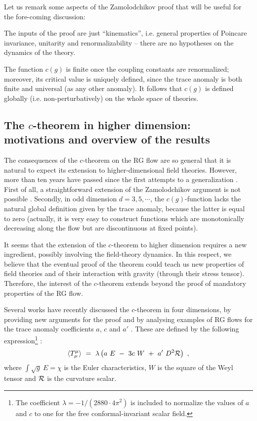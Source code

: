 \documentclass[proceedings]{JHEP}
\newcommand{\beq}{\begin{equation}}
\newcommand{\eeq}{\end{equation}}
\def\l{\lambda}
\def\bra{\langle}
\def\ket{\rangle}
\begin{document}
Let us remark some aspects of the Zamolodchikov proof that will
be useful for the fore-coming discussion:

The inputs of the proof are just ``kinematics'',
i.e. general properties of Poincare invariance,
unitarity and renormalizability -- there are no hypotheses on the
dynamics of the theory.

The function $c(g)$ is finite once the coupling
constants are renormalized; moreover, its critical
value is uniquely defined, since the trace anomaly is
both finite and universal (as any other anomaly).
It follows that $c(g)$ is defined globally 
(i.e. non-perturbatively) on the whole space of theories.





\subsection{The $c$-theorem in higher dimension: motivations
and overview of the results}

The consequences of the $c$-theorem on the RG flow
are so general that it is natural to expect its
extension to higher-dimensional field theories.
However, more than ten years have passed since the
first attempts to a generalization \cite{cardy}\cite{jo}\cite{cfl}.
First of all, a straightforward extension of the 
Zamolodchikov argument is not possible \cite{cfl}. 
Secondly, in odd dimension $d=3,5,\cdots$, the
$c(g)$-function lacks the natural global definition given by 
the trace anomaly, because the latter is equal to zero
(actually, it is very easy to construct functions
which are monotonically decreasing along the flow
but are discontinuous at fixed points).

It seems that the extension of the $c$-theorem
to higher dimension requires a new ingredient, 
possibly involving the field-theory dynamics.
In this respect, we believe that the eventual proof 
of the theorem could teach us new properties of 
field theories and of their interaction with gravity
(through their stress tensor).
Therefore, the interest of the $c$-theorem extends
beyond the proof of mandatory properties of the RG flow.

Several works have recently discussed
the $c$-theorem in four dimensions,
by providing new arguments for the proof \cite{fl}\cite{ath}
\cite{c-a} and by analysing examples of RG flows for 
the trace anomaly coefficients $a$, $c$ and $a'$ \cite{afgj}\cite{fgpw}. 
These are defined by the following expression\footnote{
The coefficient $\l=- 1/(2880\cdot 4\pi^2)$ is included
to normalize the values of $a$ and $c$ to one for
the free conformal-invariant scalar field.
} \cite{duff}:
\beq
\bra T_\mu^\mu \ket \ =\ \l \left(
a\ E \ - \ 3c \ W \ +\ a' \ D^2 {\cal R} \right)\ ,
\label{trace}\eeq
where $\int\sqrt{g}\ E = \chi$ is the Euler characteristics,
$W$ is the square of the Weyl tensor and
${\cal R}$ is the curvature scalar.
\end{document}
